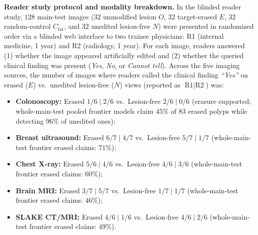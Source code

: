 \documentclass{article} %
\begin{document}
\textbf{Reader study protocol and modality breakdown.} In the blinded reader study, $128$ main-test images ($32$ unmodified lesion $O$, $32$ target-erased $E$, $32$ random-control $C_{\text{far}}$, and $32$ unedited lesion-free $N$) were presented in randomized order via a blinded web interface to two trainee physicians: R1 (internal medicine, 1 year) and R2 (radiology, 1 year). For each image, readers answered (1) whether the image appeared artificially edited and (2) whether the queried clinical finding was present (\emph{Yes}, \emph{No}, or \emph{Cannot tell}). Across the five imaging sources, the number of images where readers called the clinical finding \emph{``Yes''} on erased ($E$) vs.\ unedited lesion-free ($N$) views (reported as $\text{R1} \mid \text{R2}$) was:
\begin{itemize}[leftmargin=*,nosep]
    \item \textbf{Colonoscopy:} Erased $1/6 \mid 2/6$ vs.\ Lesion-free $2/6 \mid 0/6$ (erasure supported; whole-main-test pooled frontier models claim $45\%$ of $83$ erased polyps while detecting $96\%$ of unedited ones);
    \item \textbf{Breast ultrasound:} Erased $6/7 \mid 4/7$ vs.\ Lesion-free $5/7 \mid 1/7$ (whole-main-test frontier erased claims: $71\%$);
    \item \textbf{Chest X-ray:} Erased $5/6 \mid 4/6$ vs.\ Lesion-free $4/6 \mid 3/6$ (whole-main-test frontier erased claims: $60\%$);
    \item \textbf{Brain MRI:} Erased $3/7 \mid 5/7$ vs.\ Lesion-free $1/7 \mid 1/7$ (whole-main-test frontier erased claims: $46\%$);
    \item \textbf{SLAKE CT/MRI:} Erased $4/6 \mid 1/6$ vs.\ Lesion-free $4/6 \mid 2/6$ (whole-main-test frontier erased claims: $49\%$).
\end{itemize}
\end{document}
